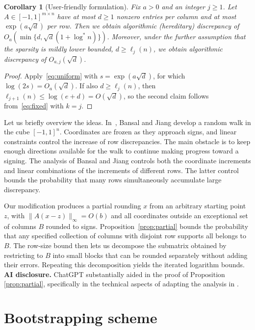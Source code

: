 \documentclass[10pt,a4paper]{amsart}
\newtheorem{corollary}[theorem]{Corollary}
\newcommand{\lstar}{\log^*}
\begin{document}
\begin{corollary}[User-friendly formulation]\label{cor:sqrt}
Fix $a>0$ and an integer $j\ge1$. Let $A\in[-1,1]^{m\times n}$ have at most $d\ge1$ nonzero entries per column and at most $\exp(a\sqrt d)$ per row. Then we obtain algorithmic (hereditary) discrepancy of $O_a(\min\{d,\sqrt d(1+\lstar n)\})$. Moreover, under the further assumption that the sparsity is mildly lower bounded, $d\ge\ell_j(n)$, we obtain algorithmic discrepancy of $O_{a,j}(\sqrt d)$.
\end{corollary}
\begin{proof}
Apply~\eqref{eq:uniform} with $s=\exp(a\sqrt d)$, for which $\log(2s)=O_a(\sqrt d)$. If also $d\ge\ell_j(n)$, then $\ell_{j+1}(n)\le\log(e+d)=O(\sqrt d)$, so the second claim follows from~\eqref{eq:fixed} with $k=j$.
\end{proof}

Let us briefly overview the ideas. In~\cite{BJ}, Bansal and Jiang develop a random walk in the cube $[-1,1]^n$. Coordinates are frozen as they approach signs, and linear constraints control the increase of row discrepancies. The main obstacle is to keep enough directions available for the walk to continue making progress toward a signing. The analysis of Bansal and Jiang controls both the coordinate increments and linear combinations of the increments of different rows. The latter control bounds the probability that many rows simultaneously accumulate large discrepancy.

Our modification produces a partial rounding $x$ from an arbitrary starting point $z$, with $\|A(x-z)\|_\infty=O(b)$ and all coordinates outside an exceptional set of columns $B$ rounded to signs. Proposition~\ref{prop:partial} bounds the probability that any specified collection of columns with disjoint row supports all belongs to $B$. The row-size bound then lets us decompose the submatrix obtained by restricting to $B$ into small blocks that can be rounded separately without adding their errors. Repeating this decomposition yields the iterated logarithm bounds. \\

\textbf{AI disclosure.} ChatGPT substantially aided in the proof of Proposition \ref{prop:partial}, specifically in the technical aspects of adapting the analysis in \cite{BJ}.


\section{Bootstrapping scheme}
\end{document}
